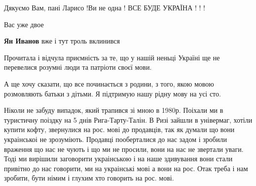 \begin{itemize}
 
Дякуємо Вам, пані Ларисо !Ви не одна ! ВСЕ БУДЕ УКРАЇНА ! ! !

\begin{itemize}
 
Вас уже двое


\begin{itemize}
 
\textbf{Ян Иванов} вже і тут троль вклинився
\end{itemize}

\end{itemize}

 

Прочитала і відчула приємність за те, що у нашій неньці Україні ще не перевелися розумні люди та патріоти своєї мови.

А ще хочу сказати, що все починається з родини, з того, якою мовою розмовляють
батьки з дітьми. Я підтримую нашу рідну мову на усі сто.


 

Ніколи не забуду випадок, який трапився зі мною в 1980р. Поіхали ми в туристичну
поіздку на 5 днів Рига-Тарту-Талін. В Ризі зайшли в універмаг, хотіли купити
кофту, звернулися на рос. мові до продавців, так як думали що вони украінськоі не
зрозуміють. Продавці пооберталися до нас задом і зробили враження що нас не
чують і що ми не просили, вони на нас не звертали уваги. Тоді ми вирішили
заговорити украінською і на наше здивування вони стали привітно до нас
говорити, ми на украінські мові а вони на рос. Отак треба і нам зробити, бути
німим і глухим хто говорить на рос. мові.


\end{itemize}
